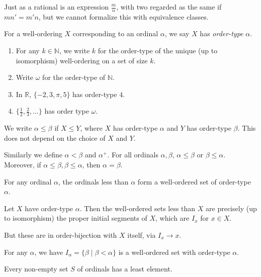 \documentclass[12pt]{article}
\begin{document}
Just as a rational is an expression $\frac{m}{n}$, with two regarded as the same if $mn' = m'n$, but we cannot formalize this with equivalence classes.

For a well-ordering $X$ corresponding to an ordinal $\alpha$, we say $X$ has \emph{order-type} $\alpha$.

\begin{exbox}
	\begin{enumerate}
		\item For any $k \in \mathbb{N}$, we write $k$ for the order-type of the unique (up to isomorphism) well-ordering on a set of size $k$.
		\item Write $\omega$ for the order-type of $\mathbb{N}$.
		\item In $\mathbb{R}$, $\{-2, 3, \pi, 5\}$ has order-type $4$.
		\item $\{\frac{1}{2}, \frac{2}{3}, \ldots \}$ has order type $\omega$.
	\end{enumerate}
\end{exbox}

We write $\alpha \leq \beta$ if $X \leq Y$, where $X$ has order-type $\alpha$ and $Y$ has order-type $\beta$. This does not depend on the choice of $X$ and $Y$.

Similarly we define $\alpha < \beta$ and $\alpha^{+}$. For all ordinals $\alpha, \beta$, $\alpha \leq \beta$ or $\beta \leq \alpha$. Moreover, if $\alpha \leq \beta, \beta \leq \alpha$, then $\alpha = \beta$.

\begin{proposition}
	For any ordinal $\alpha$, the ordinals less than $\alpha$ form a well-ordered set of order-type $\alpha$.
\end{proposition}

\begin{proofbox}
	Let $X$ have order-type $\alpha$. Then the well-ordered sets less than $X$ are precisely (up to isomorphism) the proper initial segments of $X$, which are $I_x$ for $x \in X$.

	But these are in order-bijection with $X$ itself, via $I_x \to x$.
\end{proofbox}

For any $\alpha$, we have $I_{\alpha} = \{\beta \mid \beta < \alpha\}$ is a well-ordered set with order-type $\alpha$.

\begin{proposition}
	Every non-empty set $S$ of ordinals has a least element.
\end{proposition}
\end{document}
